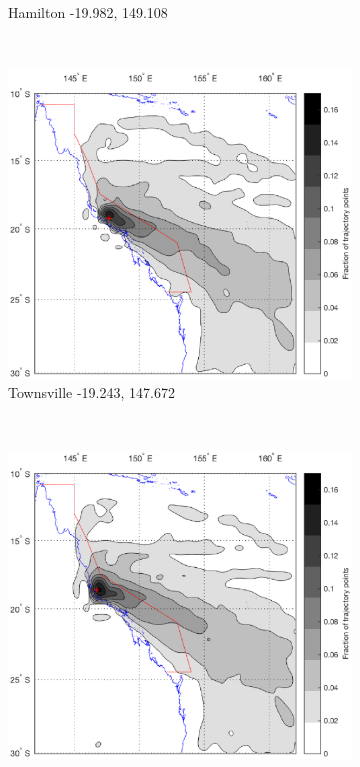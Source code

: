 \begin{figure}[!hbt]
\begin{subfigure}[b]{0.45\textwidth}
	    \caption{Hamilton -19.982, 149.108}
	    \label{subfig:aims}
    \end{subfigure}
    \\
    \begin{subfigure}[b]{0.45\textwidth}
        \includegraphics[width=\textwidth]{Fig/Research/BT_Ship/Map_103.eps}
	    \caption{Townsville -19.243, 147.672}
	    \label{subfig:orph}
    \end{subfigure}
	~
	\begin{subfigure}[b]{0.45\textwidth}
		\includegraphics[width=\textwidth]{Fig/Research/BT_Ship/Map_104.eps}

\end{subfigure}
\end{figure}
